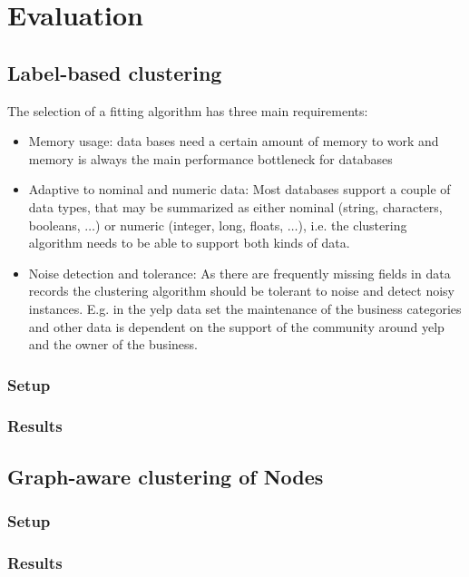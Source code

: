  \chapter{Evaluation}\label{\positionnumber}
 

\section{Label-based clustering}\label{\positionnumber}
The selection of a fitting algorithm has three main requirements:
\begin{itemize}
    \item Memory usage: data bases need a certain amount of memory to work and memory is always the main performance bottleneck for databases
    \item Adaptive to nominal and numeric data: Most databases support a couple of data types, that may be summarized as either nominal (string, characters, booleans, $\dots$) or numeric (integer, long, floats, $\dots$), i.e. the clustering algorithm needs to be able to support both kinds of data.
    \item Noise detection and tolerance: As there are frequently missing fields in data records the clustering algorithm should be tolerant to noise and detect noisy instances. E.g. in the yelp data set the maintenance of the business categories and other data is dependent on the support of the community around yelp and the owner of the business.
\end{itemize}
    \subsection{Setup}\label{\positionnumber}

    \subsection{Results}\label{\positionnumber}
        
\section{Graph-aware clustering of Nodes}\label{\positionnumber}
    \subsection{Setup}\label{\positionnumber}
   
    \subsection{Results}\label{\positionnumber}